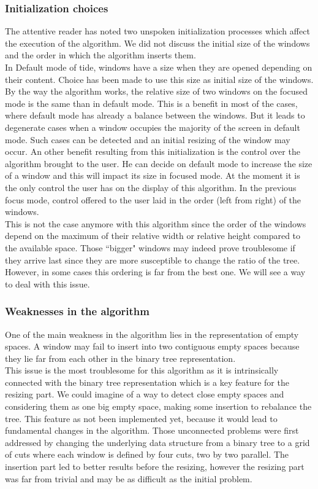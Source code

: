 \documentclass{acmtog}
\begin{document}
\subsubsection{Initialization choices}

The attentive reader has noted two unspoken initialization processes which affect the execution of the algorithm. We did not discuss the initial size of the windows and the order in which the algorithm inserts them. \\
In Default mode of tide, windows have a size when they are opened depending on their content. Choice has been made to use this size as initial size of the windows. By the way the algorithm works, the relative size of two windows on the focused mode is the same than in default mode. This is a benefit in most of the cases, where default mode has already a balance between the windows. But it leads to degenerate cases when a window occupies the majority of the screen in default mode. Such cases can be detected and an initial resizing of the window may occur. An other benefit resulting from this initialization is the control over the algorithm brought to the user. He can decide on default mode to increase the size of a window and this will impact its size in focused mode. At the moment it is the only control the user has on the display of this algorithm. In the previous focus mode, control offered to the user laid in the order (left from right) of the windows. \\
This is not the case anymore with this algorithm since the order of the windows depend on the maximum of their relative width or relative height compared to the available space. Those ``bigger" windows may indeed prove troublesome if they arrive last since they are more susceptible to change the ratio of the tree. However, in some cases this ordering is far from the best one. We will see a way to deal with this issue.

\subsubsection{Weaknesses in the algorithm}

One of the main weakness in the algorithm lies in the representation of empty spaces. A window may fail to insert into two contiguous empty spaces because they lie far from each other in the binary tree representation. \\
This issue is the most troublesome for this algorithm as it is intrinsically connected with the binary tree representation which is a key feature for the resizing part. We could imagine of a way to detect close empty spaces and considering them as one big empty space, making some insertion to rebalance the tree. This feature as not been implemented yet, because it would lead to fundamental changes in the algorithm. Those unconnected problems were first addressed by changing the underlying data structure from a binary tree to a grid of cuts where each window is defined by four cuts, two by two parallel. The insertion part led to better results before the resizing, however the resizing part was far from trivial and may be as difficult as the initial problem.
\end{document}
